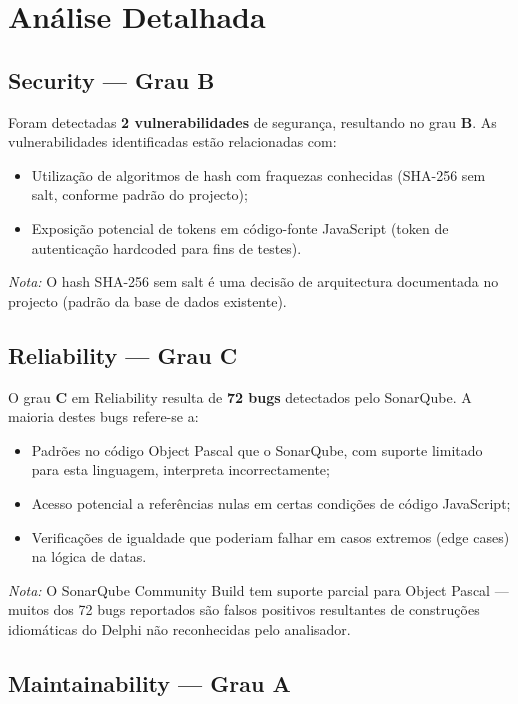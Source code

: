 \documentclass[12pt,a4paper]{article}
\begin{document}
\section{Análise Detalhada}

\subsection{Security — Grau B}

Foram detectadas \textbf{2 vulnerabilidades} de segurança, resultando no grau \textbf{B}. As vulnerabilidades identificadas estão relacionadas com:

\begin{itemize}
    \item Utilização de algoritmos de hash com fraquezas conhecidas (SHA-256 sem salt, conforme padrão do projecto);
    \item Exposição potencial de tokens em código-fonte JavaScript (token de autenticação hardcoded para fins de testes).
\end{itemize}

\textit{Nota:} O hash SHA-256 sem salt é uma decisão de arquitectura documentada no projecto (padrão da base de dados existente).

\subsection{Reliability — Grau C}

O grau \textbf{C} em Reliability resulta de \textbf{72 bugs} detectados pelo SonarQube. A maioria destes bugs refere-se a:

\begin{itemize}
    \item Padrões no código Object Pascal que o SonarQube, com suporte limitado para esta linguagem, interpreta incorrectamente;
    \item Acesso potencial a referências nulas em certas condições de código JavaScript;
    \item Verificações de igualdade que poderiam falhar em casos extremos (edge cases) na lógica de datas.
\end{itemize}

\textit{Nota:} O SonarQube Community Build tem suporte parcial para Object Pascal — muitos dos 72 bugs reportados são falsos positivos resultantes de construções idiomáticas do Delphi não reconhecidas pelo analisador.

\subsection{Maintainability — Grau A}
\end{document}
